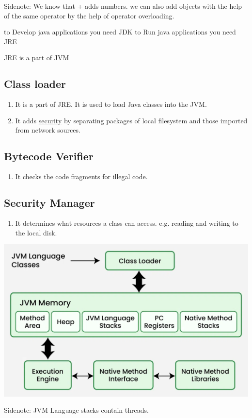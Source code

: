 \documentclass[11pt,letterpaper]{article}
\begin{document}
Sidenote: We know that + adds numbers. we can also add objects with the help of the same operator by the help of operator overloading.

to Develop java applications you need JDK 
to Run java applications you need JRE

JRE is a part of JVM 

\subsection{Class loader}
\begin{enumerate}
  \item It is a part of JRE. It is used to load Java classes into the JVM.
  \item It adds \underline{security} by separating packages of local filesystem and those imported from network sources. 
\end{enumerate}

\subsection{Bytecode Verifier}
\begin{enumerate}
  \item It checks the code fragments for illegal code.
\end{enumerate}

\subsection{Security Manager}
\begin{enumerate}
  \item It determines what resources a class can access. e.g. reading and writing to the local disk.
\end{enumerate}
\begin{center}
  \includegraphics[width=\textwidth]{figs/JVM.png}
\end{center}
Sidenote: JVM Language stacks contain threads.
\end{document}
